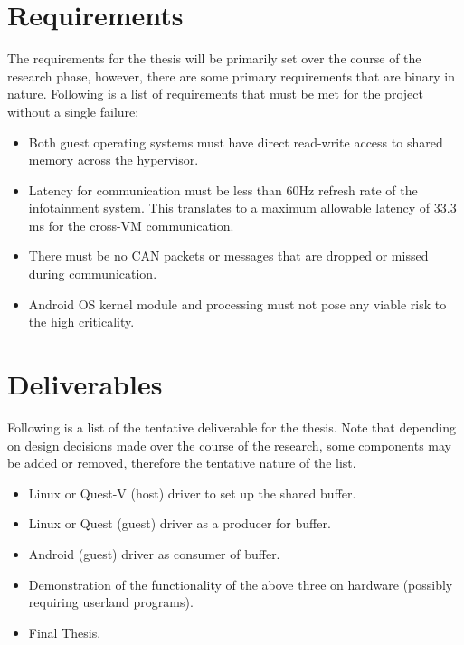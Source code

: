 \documentclass[12pt]{article}
\begin{document}
\section{Requirements}
The requirements for the thesis will be primarily set over the course of the research phase, however, there are some primary requirements that are binary in nature. Following is a list of requirements that must be met for the project without a single failure:
\begin{itemize}
	\item Both guest operating systems must have direct read-write access to shared memory across the hypervisor.
	\item Latency for communication must be less than 60Hz refresh rate of the infotainment system. This translates to a maximum allowable latency of 33.3 ms for the cross-VM communication.
	\item There must be no CAN packets or messages that are dropped or missed during communication.
	\item Android OS kernel module and processing must not pose any viable risk to the high criticality.
\end{itemize}


\section{Deliverables}
Following is a list of the tentative deliverable for the thesis. Note that depending on design decisions made over the course of the research, some components may be added or removed, therefore the tentative nature of the list.

\begin{itemize}
	\item Linux or Quest-V (host) driver to set up the shared buffer.
	\item Linux or Quest (guest) driver as a producer for buffer.
	\item Android (guest) driver as consumer of buffer.
	\item Demonstration of the functionality of the above three on hardware (possibly requiring userland programs).
	\item Final Thesis.
\end{itemize}
\end{document}
